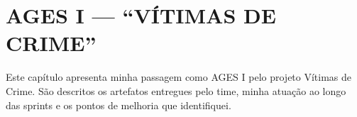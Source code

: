 \chapter[AGES I --- “VÍTIMAS DE CRIME”]{AGES I --- “VÍTIMAS DE CRIME”}

Este capítulo apresenta minha passagem como AGES I pelo projeto Vítimas de Crime.
São descritos os artefatos entregues pelo time, minha atuação ao longo das sprints
e os pontos de melhoria que identifiquei.





